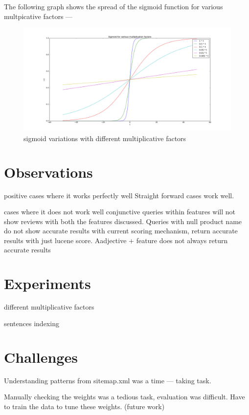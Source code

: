 \documentclass{article}
\begin{document}
The following graph shows the spread of the sigmoid function for various multpicative factors ---
\begin{figure}[ht!]
  \centering
  \includegraphics[width=1\textwidth]{sigmoidVariations}
  \caption{sigmoid variations with different multiplicative factors\label{fig:sigmoid}}
\end{figure}

\section{Observations}
\begin{description}
\item positive cases where it works perfectly well
Straight forward cases work well.
\item cases where it does not work well
conjunctive queries within features will not show reviews with both the features discussed.
Queries with null product name do not show accurate results with current scoring mechanism, return accurate results with just lucene score. Aadjective + feature does not always return accurate results
\end{description}

\section{Experiments}
\begin{description}
\item different multiplicative factors
\item sentences indexing
\end{description}

\section{Challenges}
\begin{description}
\item Understanding patterns from sitemap.xml was a time --- taking task.
\item Manually checking the weights was a tedious task, evaluation was difficult. Have to train the data to tune these weights. (future work)
\end{description}
\end{document}
